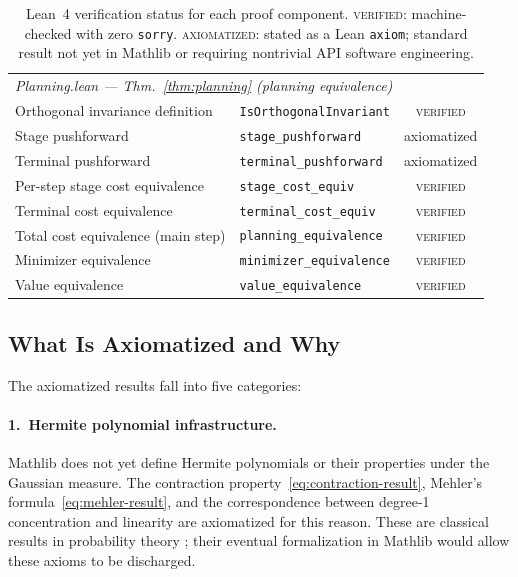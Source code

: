 \begin{table}[h]
\begin{tabular}{llc}
\multicolumn{3}{l}{\textit{Planning.lean --- Thm.~\ref{thm:planning} (planning equivalence)}} \\
Orthogonal invariance definition        & \texttt{IsOrthogonalInvariant}   & \textsc{verified} \\
Stage pushforward                        & \texttt{stage\_pushforward}      & axiomatized \\
Terminal pushforward                     & \texttt{terminal\_pushforward}   & axiomatized \\
Per-step stage cost equivalence          & \texttt{stage\_cost\_equiv}      & \textsc{verified} \\
Terminal cost equivalence                & \texttt{terminal\_cost\_equiv}   & \textsc{verified} \\
Total cost equivalence (main step)       & \texttt{planning\_equivalence}   & \textsc{verified} \\
Minimizer equivalence                    & \texttt{minimizer\_equivalence}  & \textsc{verified} \\
Value equivalence                        & \texttt{value\_equivalence}      & \textsc{verified} \\
\bottomrule
\end{tabular}
\vspace{1pt}
\caption{Lean~4 verification status for each proof component. \textsc{verified}: machine-checked with zero \texttt{sorry}. \textsc{axiomatized}: stated as a Lean \texttt{axiom}; standard result not yet in Mathlib or requiring nontrivial API software engineering.}
\label{tab:lean-summary}
\end{table}

\subsection{What Is Axiomatized and Why}

The axiomatized results fall into five categories:

\paragraph{1.\ Hermite polynomial infrastructure.}
Mathlib does not yet define Hermite polynomials or their properties under the Gaussian measure. The contraction property~\eqref{eq:contraction-result}, Mehler's formula~\eqref{eq:mehler-result}, and the correspondence between degree-1 concentration and linearity are axiomatized for this reason. These are classical results in probability theory \citep{mehler1866, lancaster1958}; their eventual formalization in Mathlib would allow these axioms to be discharged.

